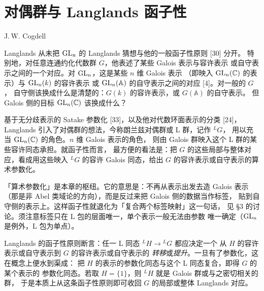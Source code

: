 \chapter{对偶群与 Langlands 函子性}\label{ch:11}

\begin{center}
J.\,W. Cogdell
\end{center}

Langlands 从未把 $\mathrm{GL}_n$ 的 Langlands 猜想与他的一般函子性原则 [30] 分开。
特别地，对任意连通约化代数群 $G$，他表述了某些 Galois 表示与容许表示
或自守表示之间的一个对应。对 $\mathrm{GL}_n$，这是某些 $n$ 维 Galois 表示
（即映入 $\mathrm{GL}_n(\mathbb{C})$ 的表示）与 $\mathrm{GL}_n(k)$ 的容许表示
或 $\mathrm{GL}_n(\mathbb{A})$ 的自守表示之间的对应 [4]。对一般的 $G$，
自守侧该换成什么是清楚的：$G(k)$ 的容许表示，或 $G(\mathbb{A})$ 的自守表示。
但 Galois 侧的目标 $\mathrm{GL}_n(\mathbb{C})$ 该换成什么？

基于无分歧表示的 Satake 参数化 [33]，以及他对代数环面表示的分类 [24]，
Langlands 引入了对偶群的想法，今称朗兰兹对偶群或 L 群，记作 ${}^{L}G$，
用以充当 $\mathrm{GL}_n(\mathbb{C})$ 的角色。$n$ 维 Galois 表示的角色，
则由 Galois 群映入这个 L 群的某些容许同态承担。就函子性而言，
最方便的看法是：把 $G$ 的这些局部与整体对应，看成用这些映入 ${}^{L}G$
的容许 Galois 同态，给出 $G$ 的容许表示或自守表示的算术参数化。
\begin{annote}
「算术参数化」是本章的枢纽。它的意思是：不再从表示出发去造 Galois 表示
（那是非 Abel 类域论的方向），而是反过来把 Galois 侧的数据当作标签，
贴到自守侧的表示上。这样函子性就退化为「复合两个标签映射」这一句话，
见 \S3 的讨论。须注意标签只在 L 包的层面唯一，单个表示一般无法由参数
唯一确定（$\mathrm{GL}_n$ 是例外，L 包为单点）。
\par{}
\end{annote}

Langlands 的函子性原则断言：任一 L 同态 ${}^{L}H\to{}^{L}G$ 都应决定一个
从 $H$ 的容许表示或自守表示到 $G$ 的容许表示或自守表示的
\emph{转移}或\emph{提升}。一旦有了参数化，这在概念上便水到渠成：
把 $H$ 的表示的参数化同态与这个 L 同态复合，即得 $G$ 的某个表示的
参数化同态。若取 $H=\{1\}$，则 ${}^{L}H$ 就是 Galois 群或与之密切相关的群，
于是本质上从这条函子性原则即可收回 $G$ 的局部或整体 Langlands 对应。

